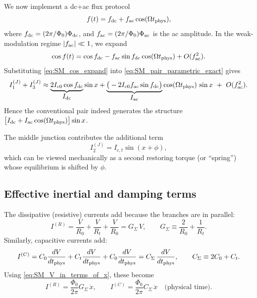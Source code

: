 \documentclass[prl,twocolumn,superscriptaddress,showpacs,nofootinbib]{revtex4-2}
\begin{document}
We now implement a dc+ac flux protocol
\begin{equation}
f(t)=f_{\rm dc}+f_{\rm ac}\cos(\Omega t_{\rm phys}),
\label{eq:SM_flux_protocol}
\end{equation}
where $f_{\rm dc}=(2\pi/\Phi_0)\Phi_{\rm dc}$, and $f_{\rm ac}=(2\pi/\Phi_0)\Phi_{\rm ac}$
is the ac amplitude. In the weak-modulation regime $|f_{\rm ac}|\ll 1$, we expand
\begin{equation}
\cos f(t)
=
\cos f_{\rm dc}
-
f_{\rm ac}\sin f_{\rm dc}\cos(\Omega t_{\rm phys})
+O(f_{\rm ac}^2).
\label{eq:SM_cos_expand}
\end{equation}
Substituting \eqref{eq:SM_cos_expand} into \eqref{eq:SM_pair_parametric_exact} gives
\begin{equation}
I_1^{(J)}+I_3^{(J)}
\approx
\underbrace{2I_{c0}\cos f_{\rm dc}}_{\displaystyle I_{\rm dc}}\sin x
+
\underbrace{\big(-2I_{c0}f_{\rm ac}\sin f_{\rm dc}\big)}_{\displaystyle I_{\rm ac}}
\cos(\Omega t_{\rm phys})\,\sin x
\ +\ O(f_{\rm ac}^2).
\label{eq:SM_pair_parametric_expand}
\end{equation}
Hence the conventional pair indeed generates the structure
$\big[I_{\rm dc}+I_{\rm ac}\cos(\Omega t_{\rm phys})\big]\sin x$.

The middle junction contributes the additional term
\begin{equation}
I_2^{(J)}=I_{c,t}\sin(x+\phi),
\label{eq:SM_anomalous_term}
\end{equation}
which can be viewed mechanically as a second restoring torque (or ``spring'')
whose equilibrium is shifted by $\phi$.

\subsection{Effective inertial and damping terms}
\label{sec:SM_damping_inertia}
The dissipative (resistive) currents add because the branches are in parallel:
\begin{equation}
I^{(R)}= \frac{V}{R_0}+\frac{V}{R_t}+\frac{V}{R_0}
=
G_\Sigma\,V,
\qquad
G_\Sigma\equiv \frac{2}{R_0}+\frac{1}{R_t}.
\label{eq:SM_Gsum}
\end{equation}
Similarly, capacitive currents add:
\begin{equation}
I^{(C)}=
C_0\frac{dV}{dt_{\rm phys}}+C_t\frac{dV}{dt_{\rm phys}}+C_0\frac{dV}{dt_{\rm phys}}
=
C_\Sigma\,\frac{dV}{dt_{\rm phys}},
\qquad
C_\Sigma\equiv 2C_0+C_t.
\label{eq:SM_Csum}
\end{equation}
Using \eqref{eq:SM_V_in_terms_of_x}, these become
\begin{equation}
I^{(R)}=\frac{\Phi_0}{2\pi}G_\Sigma\,\dot x,
\qquad
I^{(C)}=\frac{\Phi_0}{2\pi}C_\Sigma\,\ddot x
\quad \text{(physical time)}.
\label{eq:SM_RC_in_x}
\end{equation}
\end{document}
